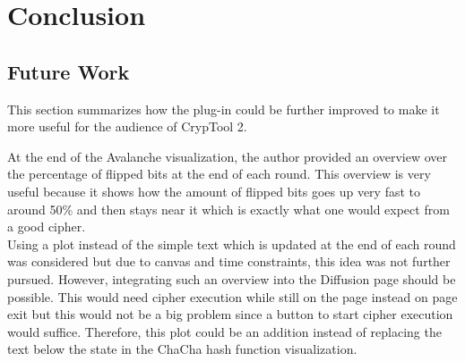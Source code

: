 
\chapter{Conclusion}
\label{chap:conclusion}

\section{Future Work}
\label{sec:futureWork}

This section summarizes how the plug-in could be further improved to make it more useful for the audience of CrypTool 2.

\begin{description}[style=nextline]

\item[Better overview over flipped bits at the end of each round]

At the end of the Avalanche visualization, the author provided an overview over the percentage of flipped bits at the end of each round. This overview is very useful because it shows how the amount of flipped bits goes up very fast to around 50\% and then stays near it which is exactly what one would expect from a good cipher. \\
Using a plot instead of the simple text which is updated at the end of each round was considered but due to canvas and time constraints, this idea was not further pursued. However, integrating such an overview into the Diffusion page should be possible. This would need cipher execution while still on the page instead on page exit but this would not be a big problem since a button to start cipher execution would suffice. Therefore, this plot could be an addition instead of replacing the text below the state in the ChaCha hash function visualization.

\item[Improve performance during diffusion]


\end{description}

